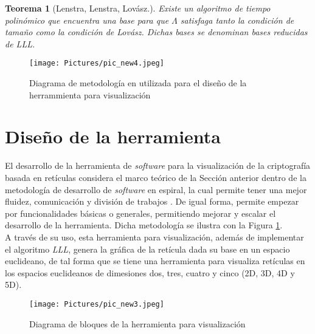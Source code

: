 \documentclass{llncs}
\newtheorem{teor}{Teorema}
\begin{document}
	\begin{teor}[Lenstra, Lenstra, Lov\'asz.] Existe un algoritmo de tiempo polin\'omico que encuentra una base para que $\Lambda$ satisfaga tanto la condici\'on de tamaño como la condici\'on de Lov\'asz. Dichas bases se denominan bases reducidas de LLL.
	\end{teor}

\begin{figure}
	\centering
	\texttt{[image: Pictures/pic\_new4.jpeg]}
	\caption{Diagrama de metodolog\'ia en utilizada para el diseño de la herrammienta para visualización}
	\label{Metodologia}
\end{figure}

\section{Diseño de la herramienta}
\label{Diseño}
El desarrollo de la herramienta de \textit{software} para la visualizaci\'on de la criptograf\'ia basada en ret\'iculas considera el marco te\'orico de la Secci\'on anterior dentro de la metodolog\'ia de desarrollo de \textit{software} en espiral, la cual permite tener una mejor fluidez, comunicaci\'on y divisi\'on de trabajos \cite{b15}. De igual forma, permite empezar por funcionalidades b\'asicas o generales, permitiendo mejorar y escalar el desarrollo de la herramienta. Dicha metodología se ilustra con la Figura \ref{Metodologia}.\\ %
A través de su uso, esta herramienta para visualizaci\'on, además de implementar el algoritmo \textit{LLL}, genera la gr\'afica de la ret\'icula dada su base en un espacio euclideano, de tal forma que se tiene una herramienta para visualiza ret\'iculas en los espacios euclideanos de dimesiones dos, tres, cuatro y cinco (2D, 3D, 4D y 5D).\\

\begin{figure}[hbt]
	\centering
	\texttt{[image: Pictures/pic\_new3.jpeg]}
	\caption{Diagrama de bloques de la herramienta para visualizaci\'on}
	\label{bloques}
\end{figure}
\end{document}

